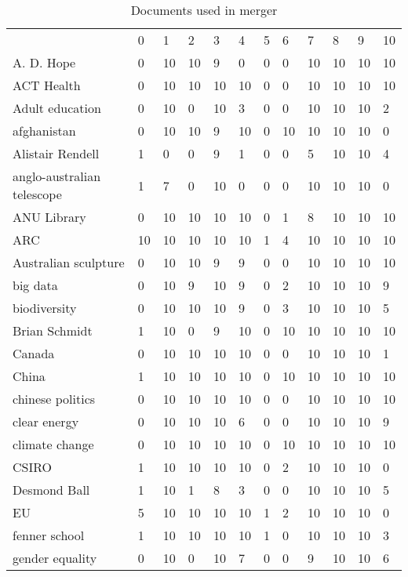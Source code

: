 \begin{table}
\caption{Documents used in merger}
\label{table:doc_stat2}
\begin{tabular*}{0.5\textwidth}{|p{5cm}|l|l|l|l|l|l|l|l|l|l|l|}
\cline{1-12}
 	& 0 & 1 & 2 & 3 & 4 & 5 & 6 & 7 & 8 & 9 & 10 \\\cline{1-12}
A. D. Hope &0 &10 &10 &9 &0 &0 &0 &10 &10 &10 &10\\
\cline{1-12}
ACT Health &0 &10 &10 &10 &10 &0 &0 &10 &10 &10 &10\\
\cline{1-12}
Adult education &0 &10 &0 &10 &3 &0 &0 &10 &10 &10 &2\\
\cline{1-12}
afghanistan &0 &10 &10 &9 &10 &0 &10 &10 &10 &10 &0\\
\cline{1-12}
Alistair Rendell &1 &0 &0 &9 &1 &0 &0 &5 &10 &10 &4\\
\cline{1-12}
anglo-australian telescope &1 &7 &0 &10 &0 &0 &0 &10 &10 &10 &0\\
\cline{1-12}
ANU Library &0 &10 &10 &10 &10 &0 &1 &8 &10 &10 &10\\
\cline{1-12}
ARC &10 &10 &10 &10 &10 &1 &4 &10 &10 &10 &10\\
\cline{1-12}
Australian sculpture &0 &10 &10 &9 &9 &0 &0 &10 &10 &10 &10\\
\cline{1-12}
big data &0 &10 &9 &10 &9 &0 &2 &10 &10 &10 &9\\
\cline{1-12}
biodiversity &0 &10 &10 &10 &9 &0 &3 &10 &10 &10 &5\\
\cline{1-12}
Brian Schmidt &1 &10 &0 &9 &10 &0 &10 &10 &10 &10 &10\\
\cline{1-12}
Canada &0 &10 &10 &10 &10 &0 &0 &10 &10 &10 &1\\
\cline{1-12}
China &1 &10 &10 &10 &10 &0 &10 &10 &10 &10 &10\\
\cline{1-12}
chinese politics &0 &10 &10 &10 &10 &0 &0 &10 &10 &10 &10\\
\cline{1-12}
clear energy &0 &10 &10 &10 &6 &0 &0 &10 &10 &10 &9\\
\cline{1-12}
climate change &0 &10 &10 &10 &10 &0 &10 &10 &10 &10 &10\\
\cline{1-12}
CSIRO &1 &10 &10 &10 &10 &0 &2 &10 &10 &10 &0\\
\cline{1-12}
Desmond Ball &1 &10 &1 &8 &3 &0 &0 &10 &10 &10 &5\\
\cline{1-12}
EU &5 &10 &10 &10 &10 &1 &2 &10 &10 &10 &0\\
\cline{1-12}
fenner school &1 &10 &10 &10 &10 &1 &0 &10 &10 &10 &3\\
\cline{1-12}
gender equality &0 &10 &0 &10 &7 &0 &0 &9 &10 &10 &6\\

\end{tabular*}
\end{table}
